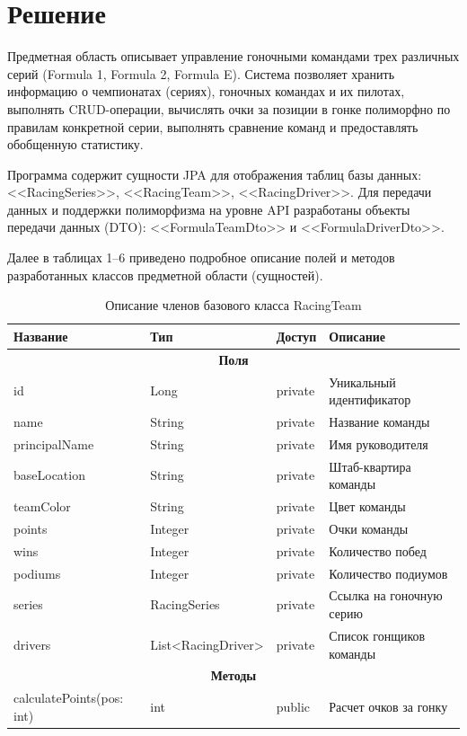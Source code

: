 \documentclass[oneside,a4paper,14pt]{extarticle}
\begin{document}
\section*{\hspace{12.5mm}Решение}
Предметная область описывает управление гоночными командами трех различных серий (Formula 1, Formula 2, Formula E). Система позволяет хранить информацию о чемпионатах (сериях), гоночных командах и их пилотах, выполнять CRUD-операции, вычислять очки за позиции в гонке полиморфно по правилам конкретной серии, выполнять сравнение команд и предоставлять обобщенную статистику.

Программа содержит сущности JPA для отображения таблиц базы данных: <<RacingSeries>>, <<RacingTeam>>, <<RacingDriver>>. Для передачи данных и поддержки полиморфизма на уровне API разработаны объекты передачи данных (DTO): <<FormulaTeamDto>> и <<FormulaDriverDto>>.

Далее в таблицах 1--6 приведено подробное описание полей и методов разработанных классов предметной области (сущностей).

\begin{table}[H]
\centering
\caption{Описание членов базового класса RacingTeam}
\begin{tabular}{|p{4.5cm}|p{3.5cm}|p{2cm}|p{5cm}|}
\hline
\textbf{Название} & \textbf{Тип} & \textbf{Доступ} & \textbf{Описание} \\ \hline
\multicolumn{4}{|c|}{\textbf{Поля}} \\ \hline
id & Long & private & Уникальный идентификатор \\ \hline
name & String & private & Название команды \\ \hline
principalName & String & private & Имя руководителя \\ \hline
baseLocation & String & private & Штаб-квартира команды \\ \hline
teamColor & String & private & Цвет команды \\ \hline
points & Integer & private & Очки команды \\ \hline
wins & Integer & private & Количество побед \\ \hline
podiums & Integer & private & Количество подиумов \\ \hline
series & RacingSeries & private & Ссылка на гоночную серию \\ \hline
drivers & List<RacingDriver> & private & Список гонщиков команды \\ \hline
\multicolumn{4}{|c|}{\textbf{Методы}} \\ \hline
calculatePoints(pos: int) & int & public & Расчет очков за гонку \\ \hline
\end{tabular}
\end{table}
\end{document}
